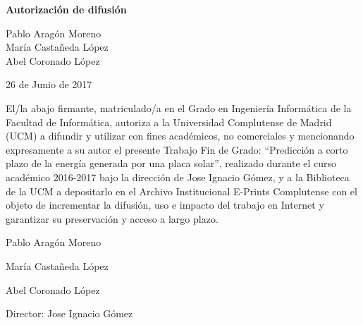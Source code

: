 
\newpage

\thispagestyle{empty}

\begin{center}

{\bf \Huge Autorización de difusión}

\vspace{1cm}

    {\large Pablo Aragón Moreno}\\
    {\large María Castañeda López}\\
    {\large Abel Coronado López}\\

   \vspace{0.5cm}


   26 de Junio de 2017\\
   \vspace{0.5cm}

\end{center}
   
El/la abajo firmante, matriculado/a en el Grado en Ingeniería Informática de la Facultad de Informática, autoriza a la Universidad Complutense de Madrid (UCM) a difundir y utilizar con fines académicos, no comerciales y mencionando expresamente a su autor el presente Trabajo Fin de Grado: “Predicción a corto plazo de la energía
    generada por una placa solar”, realizado durante el curso académico 2016-2017 bajo la dirección de Jose Ignacio Gómez, y a la Biblioteca de la UCM a depositarlo en el Archivo Institucional E-Prints Complutense con el objeto de incrementar la difusión, uso e impacto del trabajo en Internet y garantizar su preservación y acceso a largo plazo.

\vspace{2cm}

{\large Pablo Aragón Moreno}

\vspace{2.5cm}

{\large María Castañeda López}

\vspace{2.5cm}

{\large Abel Coronado López}

\vspace{2.5cm}

{\large Director: Jose Ignacio Gómez}